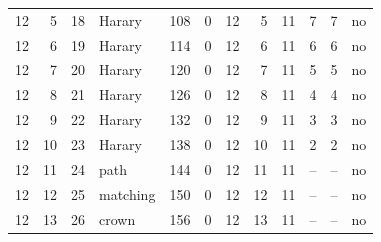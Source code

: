 {\begin{longtable}{rrrlrrrrrrrl}
12 & 5 & 18 & Harary & 108 & 0 & 12 & 5 & 11 & 7 & 7 & no\\
12 & 6 & 19 & Harary & 114 & 0 & 12 & 6 & 11 & 6 & 6 & no\\
12 & 7 & 20 & Harary & 120 & 0 & 12 & 7 & 11 & 5 & 5 & no\\
12 & 8 & 21 & Harary & 126 & 0 & 12 & 8 & 11 & 4 & 4 & no\\
12 & 9 & 22 & Harary & 132 & 0 & 12 & 9 & 11 & 3 & 3 & no\\
12 & 10 & 23 & Harary & 138 & 0 & 12 & 10 & 11 & 2 & 2 & no\\
12 & 11 & 24 & path & 144 & 0 & 12 & 11 & 11 & -- & -- & no\\
12 & 12 & 25 & matching & 150 & 0 & 12 & 12 & 11 & -- & -- & no\\
12 & 13 & 26 & crown & 156 & 0 & 12 & 13 & 11 & -- & -- & no\\
\end{longtable}
}
